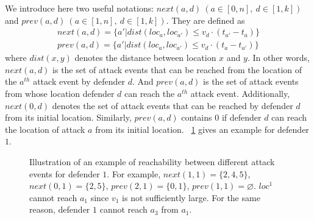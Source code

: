 We introduce here two useful notations: $next(a, d)\ (a\in[0, n],\ d\in[1,k])$ and $prev(a, d)\ (a\in[1,n],\ d \in [1,k])$.
They are defined as
\begin{align}
next(a, d) = \{ a'| dist(loc_a, loc_{a'}) \leq v_d \cdot (t_{a'} - t_a) \}    \\
prev(a, d) = \{ a'| dist(loc_a, loc_{a'}) \leq v_d \cdot (t_a - t_{a'}) \}    
\end{align}
where $dist(x,y)$ denotes the distance between location $x$ and $y$. 
In other words, $next(a, d)$ is the set of 
attack events that can be reached from the location of the $a^{th}$ attack event by defender $d$. 
And $prev(a,d)$ is the set of attack events from whose location defender $d$ can reach the $a^{th}$ attack event. 
Additionally, $next(0, d)$ denotes the set of attack events that can be reached by defender $d$ from its initial location.
Similarly, $prev(a, d)$ contains $0$ if defender $d$ can reach the location of attack $a$ from its initial location.
~\ref{fig:bd-next_prev} gives an example for defender $1$.

\begin{figure}[h]
    \centering
{}
    \caption{Illustration of an example of reachability between different attack events for defender $1$.  
    For example, $next(1, 1) = \{2,4,5\}$, $next(0,1)=\{2,5\}$, $prev(2, 1) =\{0, 1\}$, $prev(1,1)=\varnothing$.
    $loc^1$ cannot reach $a_1$ since $v_1$ is not sufficiently large. For the same reason, defender $1$ cannot reach $a_3$ from $a_1$.
    }
    \label{fig:bd-next_prev}
\end{figure}

